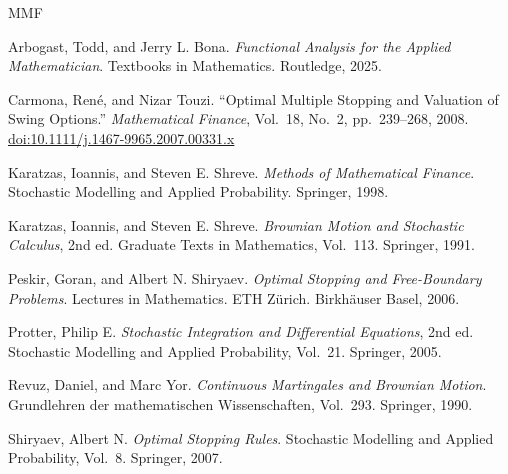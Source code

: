 \documentclass[12pt]{article}
\theoremstyle{definition}
\begin{document}
\label{sec:refs}
\begin{thebibliography}{MMF} %

    Arbogast, Todd, and Jerry L. Bona.
    \textit{Functional Analysis for the Applied Mathematician}.
    Textbooks in Mathematics. Routledge, 2025.

    Carmona, René, and Nizar Touzi.
    ``Optimal Multiple Stopping and Valuation of Swing Options.''
    \textit{Mathematical Finance}, Vol.\ 18, No.\ 2, pp.\ 239--268, 2008.
    \href{https://doi.org/10.1111/j.1467-9965.2007.00331.x}{doi:10.1111/j.1467-9965.2007.00331.x}

    Karatzas, Ioannis, and Steven E. Shreve.
    \textit{Methods of Mathematical Finance}.
    Stochastic Modelling and Applied Probability. Springer, 1998.

    Karatzas, Ioannis, and Steven E. Shreve.
    \textit{Brownian Motion and Stochastic Calculus}, 2nd ed.
    Graduate Texts in Mathematics, Vol.\ 113. Springer, 1991.

    Peskir, Goran, and Albert N. Shiryaev.
    \textit{Optimal Stopping and Free-Boundary Problems}.
    Lectures in Mathematics. ETH Z\"{u}rich. Birkh\"{a}user Basel, 2006.

    Protter, Philip E.
    \textit{Stochastic Integration and Differential Equations}, 2nd ed.
    Stochastic Modelling and Applied Probability, Vol.\ 21. Springer, 2005.

    Revuz, Daniel, and Marc Yor.
    \textit{Continuous Martingales and Brownian Motion}.
    Grundlehren der mathematischen Wissenschaften, Vol.\ 293. Springer, 1990.

    Shiryaev, Albert N.
    \textit{Optimal Stopping Rules}.
    Stochastic Modelling and Applied Probability, Vol.\ 8. Springer, 2007.

\end{thebibliography}
\end{document}
